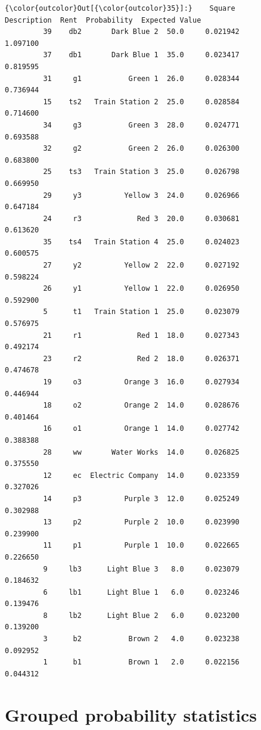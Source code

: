 \documentclass[11pt]{article}
\begin{document}
\begin{Verbatim}[commandchars=\\\{\}]
{\color{outcolor}Out[{\color{outcolor}35}]:}    Square       Description  Rent  Probability  Expected Value
         39    db2       Dark Blue 2  50.0     0.021942        1.097100
         37    db1       Dark Blue 1  35.0     0.023417        0.819595
         31     g1           Green 1  26.0     0.028344        0.736944
         15    ts2   Train Station 2  25.0     0.028584        0.714600
         34     g3           Green 3  28.0     0.024771        0.693588
         32     g2           Green 2  26.0     0.026300        0.683800
         25    ts3   Train Station 3  25.0     0.026798        0.669950
         29     y3          Yellow 3  24.0     0.026966        0.647184
         24     r3             Red 3  20.0     0.030681        0.613620
         35    ts4   Train Station 4  25.0     0.024023        0.600575
         27     y2          Yellow 2  22.0     0.027192        0.598224
         26     y1          Yellow 1  22.0     0.026950        0.592900
         5      t1   Train Station 1  25.0     0.023079        0.576975
         21     r1             Red 1  18.0     0.027343        0.492174
         23     r2             Red 2  18.0     0.026371        0.474678
         19     o3          Orange 3  16.0     0.027934        0.446944
         18     o2          Orange 2  14.0     0.028676        0.401464
         16     o1          Orange 1  14.0     0.027742        0.388388
         28     ww       Water Works  14.0     0.026825        0.375550
         12     ec  Electric Company  14.0     0.023359        0.327026
         14     p3          Purple 3  12.0     0.025249        0.302988
         13     p2          Purple 2  10.0     0.023990        0.239900
         11     p1          Purple 1  10.0     0.022665        0.226650
         9     lb3      Light Blue 3   8.0     0.023079        0.184632
         6     lb1      Light Blue 1   6.0     0.023246        0.139476
         8     lb2      Light Blue 2   6.0     0.023200        0.139200
         3      b2           Brown 2   4.0     0.023238        0.092952
         1      b1           Brown 1   2.0     0.022156        0.044312
\end{Verbatim}
            
    \hypertarget{grouped-probability-statistics}{%
\section{Grouped probability
statistics}\label{grouped-probability-statistics}}
\end{document}

